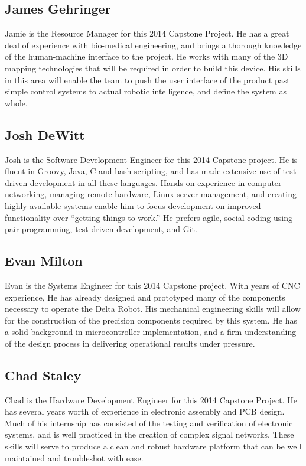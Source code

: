 \documentclass[11pt]{report}
\begin{document}
\subsection{James Gehringer}
Jamie is the Resource Manager for this 2014 Capstone Project. He has a great deal of experience with bio-medical engineering, and brings a thorough knowledge of the human-machine interface to the project.
He works with many of the 3D mapping technologies that will be required in order to build this device.
His skills in this area will enable the team to push the user interface of the product past simple control systems to actual robotic intelligence, and define the system as whole.

\subsection{Josh DeWitt}
Josh is the Software Development Engineer for this 2014 Capstone project.
He is fluent in Groovy, Java, C and bash scripting, and has made extensive use of test-driven development in all these languages.
Hands-on experience in computer networking, managing remote hardware, Linux server management, and creating highly-available systems enable him to focus development on improved functionality over “getting things to work.”
He prefers agile, social coding using pair programming, test-driven development, and Git. 

\subsection{Evan Milton}
Evan is the Systems Engineer for this 2014 Capstone project.
With years of CNC experience, He has already designed and prototyped many of the components necessary to operate the Delta Robot.
His mechanical engineering skills will allow for the construction of the precision components required by this system.
He has a solid background in microcontroller implementation, and a firm understanding of the design process in delivering operational results under pressure.

\subsection{Chad Staley}
Chad is the Hardware Development Engineer for this 2014 Capstone Project.
He has several years worth of experience in electronic assembly and PCB design.
Much of his internship has consisted of the testing and verification of electronic systems, and is well practiced in the creation of complex signal networks.
These skills will serve to produce a clean and robust hardware platform that can be well maintained and troubleshot with ease.
\end{document}
